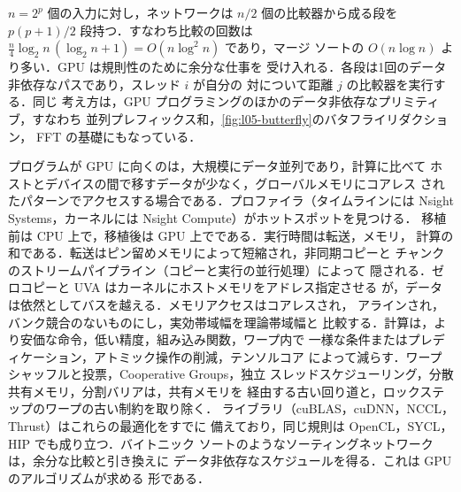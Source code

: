 \documentclass[../main.tex]{subfiles}
\begin{document}
$n = 2^p$ 個の入力に対し，ネットワークは $n/2$ 個の比較器から成る段を
$p(p+1)/2$ 段持つ．すなわち比較の回数は
$\frac{n}{4}\log_2 n\,(\log_2 n + 1) = O(n \log^2 n)$ であり，マージ
ソートの $O(n \log n)$ より多い．GPU は規則性のために余分な仕事を
受け入れる．各段は1回のデータ非依存なパスであり，スレッド $i$ が自分の
対について距離 $j$ の比較器を実行する．同じ
考え方は，GPU プログラミングのほかのデータ非依存なプリミティブ，すなわち
並列プレフィックス和，\cref{fig:l05-butterfly}のバタフライリダクション，
FFT の基礎にもなっている．

\begin{keypoint}[章のまとめ]
  プログラムが GPU に向くのは，大規模にデータ並列であり，計算に比べて
  ホストとデバイスの間で移すデータが少なく，グローバルメモリにコアレス
  されたパターンでアクセスする場合である．プロファイラ（タイムラインには
  Nsight Systems，カーネルには Nsight Compute）がホットスポットを見つける．
  移植前は CPU 上で，移植後は GPU 上でである．実行時間は転送，メモリ，
  計算の和である．転送はピン留めメモリによって短縮され，非同期コピーと
  チャンクのストリームパイプライン（コピーと実行の並行処理）によって
  隠される．ゼロコピーと UVA はカーネルにホストメモリをアドレス指定させる
  が，データは依然としてバスを越える．メモリアクセスはコアレスされ，
  アラインされ，バンク競合のないものにし，実効帯域幅を理論帯域幅と
  比較する．計算は，より安価な命令，低い精度，組み込み関数，ワープ内で
  一様な条件またはプレディケーション，アトミック操作の削減，テンソルコア
  によって減らす．ワープシャッフルと投票，Cooperative Groups，独立
  スレッドスケジューリング，分散共有メモリ，分割バリアは，共有メモリを
  経由する古い回り道と，ロックステップのワープの古い制約を取り除く．
  ライブラリ（cuBLAS，cuDNN，NCCL，Thrust）はこれらの最適化をすでに
  備えており，同じ規則は OpenCL，SYCL，HIP でも成り立つ．バイトニック
  ソートのようなソーティングネットワークは，余分な比較と引き換えに
  データ非依存なスケジュールを得る．これは GPU のアルゴリズムが求める
  形である．
\end{keypoint}
\end{document}
